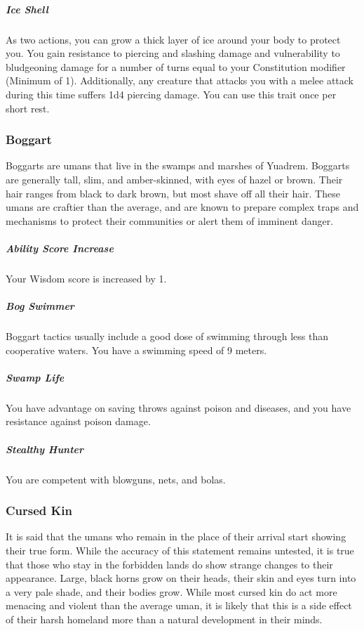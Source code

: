     \subparagraph{Ice Shell} As two actions, you can grow a thick layer of ice around your body to protect you.
    You gain resistance to piercing and slashing damage and vulnerability to bludgeoning damage for a number of turns equal to your Constitution modifier (Minimum of 1).
    Additionally, any creature that attacks you with a melee attack during this time suffers 1d4 piercing damage.
    You can use this trait once per short rest.

\subsubsection{Boggart}
    Boggarts are umans that live in the swamps and marshes of Yuadrem.
    Boggarts are generally tall, slim, and amber-skinned, with eyes of hazel or brown.
    Their hair ranges from black to dark brown, but most shave off all their hair.
    These umans are craftier than the average, and are known to prepare complex traps and mechanisms to protect their communities or alert them of imminent danger.

    \subparagraph{Ability Score Increase} Your Wisdom score is increased by 1.

    \subparagraph{Bog Swimmer} Boggart tactics usually include a good dose of swimming through less than cooperative waters.
    You have a swimming speed of 9 meters.

    \subparagraph{Swamp Life} You have advantage on saving throws against poison and diseases, and you have resistance against poison damage.

    \subparagraph{Stealthy Hunter} You are competent with blowguns, nets, and bolas.

\subsubsection{Cursed Kin}
    It is said that the umans who remain in the place of their arrival start showing their true form.
    While the accuracy of this statement remains untested, it is true that those who stay in the forbidden lands do show strange changes to their appearance.
    Large, black horns grow on their heads, their skin and eyes turn into a very pale shade, and their bodies grow.
    While most cursed kin do act more menacing and violent than the average uman, it is likely that this is a side effect of their harsh homeland more than a natural development in their minds.

